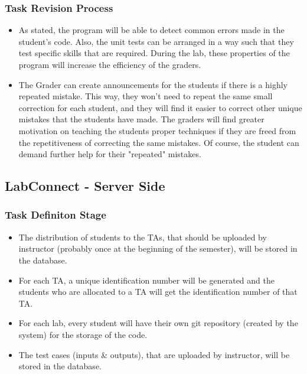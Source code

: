\documentclass[a4paper, 12pt]{article}
\begin{document}
    \subsubsection{Task Revision Process}

    \begin{itemize}
      \item As stated, the program will be able to detect common errors made in the student's code.
      Also, the unit tests can be arranged in a way such that they test specific skills that are
      required. During the lab, these properties of the program will increase the efficiency of the
      graders.
      \item The Grader can create announcements for the students if there is a highly repeated
      mistake. This way, they won't need to repeat the same small correction for each student,
      and they will find it easier to correct other unique mistakes that the students
      have made. The graders will find greater motivation on teaching the students proper techniques
      if they are freed from the repetitiveness of correcting the same mistakes. Of course, the student can demand
      further help for their "repeated" mistakes.
    \end{itemize}

    \subsection{LabConnect - Server Side}

    \subsubsection{Task Definiton Stage}
    \begin{itemize}
      \item The distribution of students to the TAs, that should be uploaded by instructor (probably once at the
      beginning of the semester), will be stored in the database.
      \item For each TA, a unique identification number will be generated and the students who are allocated to a
      TA will get the identification number of that TA.
      \item For each lab, every student will have their own git repository (created by the system) for the storage of the
      code.
      \item The test cases (inputs \& outputs), that are uploaded by instructor, will be stored in the database.
    \end{itemize}
\end{document}
